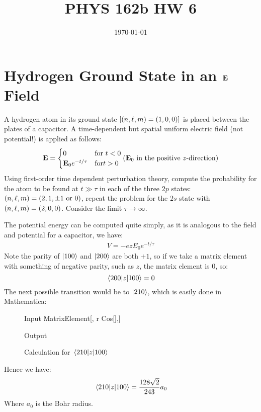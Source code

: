 \documentclass[12pt]{article}
\title{\vspace{-3em}PHYS 162b HW 6}
\date{\today}
\begin{document}
\maketitle
\section{Hydrogen Ground State in an $\vb{E}$ Field}
\begin{problem}
  A hydrogen atom in its ground state $[(n,\ell,m)=(1,0,0)]$ is placed between the plates of a capacitor. A time-dependent but spatial uniform electric field (not potential!) is applied as follows:
  \begin{align*}
    \vb{E}=
    \begin{cases}
      0 & \text{for }t<0\\
      \vb{E}_0e^{-t/\tau} & \text{for} t>0
    \end{cases}
    (\vb{E}_0\text{ in the positive $z$-direction})
  \end{align*}
  Using first-order time dependent perturbation theory, compute the probability for the atom to be found at $t\gg\tau$ in each of the three $2p$ states: $(n,\ell,m)=(2,1,\pm1\text{ or }0)$, repeat the problem for the $2s$ state with $(n,\ell,m)=(2,0,0)$. Consider the limit $\tau\to\infty$.
\end{problem}

The potential energy can be computed quite simply, as it is analogous to the field and potential for a capacitor, we have:
\begin{align*}
  V=-ezE_0e^{-t/\tau}
\end{align*}
Note the parity of $\ket{100}$ and $\ket{200}$ are both $+1$, so if we take a matrix element with something of negative parity, such as $z$, the matrix element is 0, so:
\begin{equation}
  \label{eq:1}
  \mel{200}{z}{100}=0
\end{equation}
The next possible transition would be to $\ket{210}$, which is easily done in Mathematica:
\begin{figure}[H]
  \centering
  \begin{mmaCell}[moredefined={MatrixElement}]{Input}
    MatrixElement[, r Cos[\mmaUnd{\(\pmb{\theta}\)}],]
  \end{mmaCell}
  \begin{mmaCell}{Output}
  \end{mmaCell}
    \caption{Calculation for $\mel{210}{z}{100}$}
\end{figure}
Hence we have:
\begin{align*}
  \mel{210}{z}{100}=\frac{128\sqrt{2}}{243}a_0  
\end{align*}
Where $a_0$ is the Bohr radius.
\end{document}

